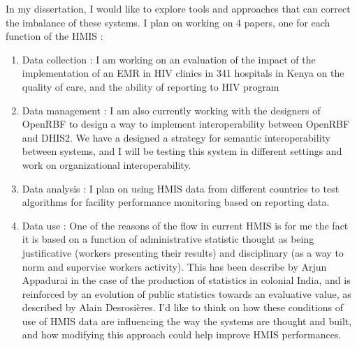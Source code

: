 \documentclass[a4paper,11pt,final,twoside]{article}
\begin{document}
In my dissertation, I would like to explore tools and approaches that can correct the imbalance of these systems. I plan on working on 4 papers, one for each function of the HMIS :
\begin{enumerate}
\item	Data collection : I am working on an evaluation of the impact of the implementation of an EMR in HIV clinics in 341 hospitals in Kenya on the quality of care, and the ability of reporting to HIV program
\item	Data management : I am also currently working with the designers of OpenRBF to design a way to implement interoperability between OpenRBF and DHIS2. We have a designed a strategy for semantic interoperability between systems, and I will be testing this system in different settings and work on organizational interoperability.
\item	Data analysis : I plan on using HMIS data from different countries to test algorithms for facility performance monitoring based on reporting data.
\item	Data use : One of the reasons of the flow in current HMIS is for me the fact it is based on a function of administrative statistic thought as being justificative (workers presenting their results) and disciplinary (as a way to norm and supervise workers activity). This has been describe by Arjun Appadurai in the case of the production of statistics in colonial India, and is reinforced by an evolution of public statistics towards an evaluative value, as described by Alain Desrosières. I’d like to think on how these conditions of use of HMIS data are influencing the way the systems are thought and built, and how modifying this approach could help improve HMIS performances.
\end{enumerate}


\cleardoublepage 
\tableofcontents
{}
\newpage
{}
\listoffigures 
\newpage
{}	
\listoftables

\thispagestyle{fancy}
	
\sloppy
  
\end{document}
